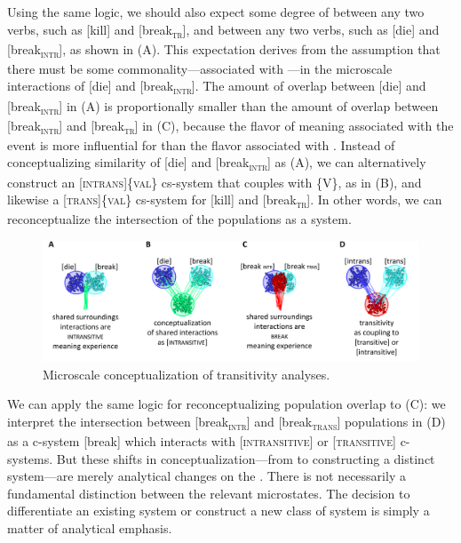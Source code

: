   Using the same logic, we should also expect some degree of  between any two  verbs, such as [kill] and [break\textsc{\textsubscript{tr}}], and between any two  verbs, such as [die] and [break\textsc{\textsubscript{intr}}], as shown in {}(A). This expectation derives from the assumption that there must be some commonality—associated with —in the microscale  interactions of [die] and [break\textsc{\textsubscript{intr}}]. The amount of overlap between [die] and [break\textsc{\textsubscript{intr}}] in (A) is proportionally smaller than the amount of overlap between [break\textsc{\textsubscript{intr}}] and [break\textsc{\textsubscript{tr}}] in (C), because the flavor of meaning associated with the event is more influential for  than the flavor associated with . Instead of conceptualizing similarity of [die] and [break\textsc{\textsubscript{intr}}] as  (A), we can alternatively construct an [\textsc{intrans}]\{\textsc{val}\} cs-system that couples with \{V\}, as in (B), and likewise a [\textsc{trans}]\{\textsc{val}\} cs-system for [kill] and [break\textsc{\textsubscript{tr}}]. In other words, we can reconceptualize the intersection of the populations as a system.

  
\begin{figure}
\includegraphics[width=\textwidth]{figures/Tilsen-img73.png}
\caption{Microscale conceptualization of transitivity analyses.}
\label{fig:4:23}
\end{figure}
 

  We can apply the same logic for reconceptualizing population overlap to (C): we interpret the intersection between [break\textsubscript{\textsc{intr}}] and [break\textsubscript{\textsc{trans}}] populations in (D) as a c-system [break] which interacts with [\textsc{intransitive}] or [\textsc{transitive}] c-systems. But these shifts in conceptualization—from  to constructing a distinct system—are merely analytical changes on the . There is not necessarily a fundamental distinction between the relevant microstates. The  decision to differentiate an existing system or construct a new class of system is simply a matter of analytical emphasis.

